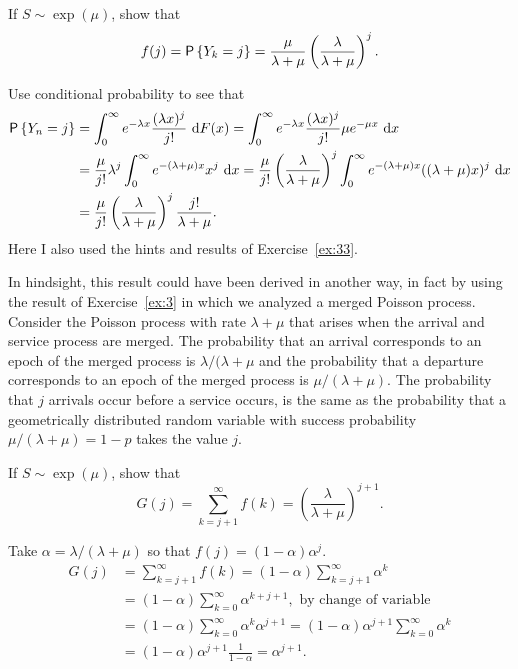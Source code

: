 \begin{question}
 If $S\sim \exp(\mu)$, show that 
  \begin{equation} \label{eq:41}
f(j) = \P{Y_k = j} = \frac{\mu}{\lambda+\mu}\left(\frac{\lambda}{\lambda+\mu}\right)^j.
  \end{equation}
  \begin{solution}
Use conditional probability to see that 
\begin{equation*}
  \begin{split}
  \P{Y_n = j} 
&= \int_0^\infty e^{-\lambda x}\frac{(\lambda x)^j}{j!}\, \d F(x) = \int_0^\infty e^{-\lambda x}\frac{(\lambda x)^j}{j!} \mu e^{-\mu x}\, \d x \\
&= \frac{\mu}{j!}\lambda^j \int_0^\infty e^{-(\lambda+\mu) x}x^j\,\d x = \frac{\mu}{j!}\left(\frac{\lambda}{\lambda+\mu}\right)^j \int_0^\infty e^{-(\lambda+\mu) x}((\lambda+\mu)x)^j\,\d x \\
&= \frac{\mu}{j!}\left(\frac{\lambda}{\lambda+\mu}\right)^j \frac{j!}{\lambda+\mu}.
\end{split}
\end{equation*}
Here I also used the hints and  results of Exercise~\ref{ex:33}.

In hindsight, this result could have been derived in another way, in
fact by using the result of Exercise~\ref{ex:3} in which we analyzed a
merged Poisson process. Consider the Poisson process with rate
$\lambda+\mu$ that arises when the arrival and service process are
merged. The probability that an arrival corresponds to an epoch of the
merged process is $\lambda/(\lambda+\mu$ and the probability that a
departure corresponds to an epoch of the merged process is
$\mu/(\lambda+\mu)$.  The probability that $j$ arrivals occur before a
service occurs, is the same as the probability that a geometrically
distributed random variable with success probability
$\mu/(\lambda+\mu) = 1-p$ takes the value $j$.
  \end{solution}
\end{question}

\begin{question}
 If $S\sim \exp(\mu)$, show that 
  \begin{equation}
G(j) = \sum_{k=j+1}^\infty f(k) =  \left(\frac{\lambda}{\lambda+\mu}\right)^{j+1}.
  \end{equation}
\begin{solution}
  Take $\alpha = \lambda/(\lambda+\mu)$ so that
  $f(j) = (1-\alpha) \alpha^j$.
\begin{equation*}
  \begin{split}
  G(j) 
&= \sum_{k=j+1}^\infty f(k)  = (1-\alpha) \sum_{k=j+1}^\infty \alpha^k \\
& = (1-\alpha) \sum_{k=0}^\infty \alpha^{k+j+1}, \text{ by change of variable}\\
& = (1-\alpha) \sum_{k=0}^\infty \alpha^{k}\alpha^{j+1}= (1-\alpha)\alpha^{j+1} \sum_{k=0}^\infty \alpha^k \\
&= (1-\alpha)\alpha^{j+1} \frac{1}{1-\alpha} = \alpha^{j+1}.
  \end{split}
\end{equation*}
    \end{solution}
\end{question}

